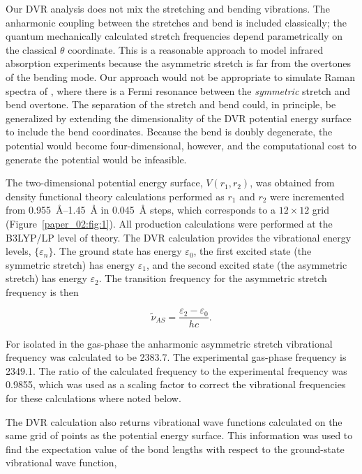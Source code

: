 Our DVR analysis does not mix the stretching and bending vibrations. The anharmonic coupling between the stretches and bend is included classically; the quantum mechanically calculated stretch frequencies depend parametrically on the classical \(\theta\) coordinate. This is a reasonable approach to model infrared absorption experiments because the asymmetric stretch is far from the overtones of the bending mode. Our approach would not be appropriate to simulate Raman spectra of , where there is a Fermi resonance between the \emph{symmetric} stretch and bend overtone. The separation of the stretch and bend could, in principle, be generalized by extending the dimensionality of the DVR potential energy surface to include the bend coordinates. Because the bend is doubly degenerate, the potential would become four-dimensional, however, and the computational cost to generate the potential would be infeasible.

The two-dimensional potential energy surface, \(V\left(r_1,r_2\right)\), was obtained from density functional theory calculations performed as \(r_1\) and \(r_2\) were incremented from \SIrange{0.955}{1.45}{\angstrom} in \SI{0.045}{\angstrom} steps, which corresponds to a \(12 \times 12\) grid (Figure~\ref{paper_02:fig:1}). All production calculations were performed at the B3LYP/LP level of theory. The DVR calculation provides the vibrational energy levels, \(\{\varepsilon_{n}\}\). The ground state has energy \(\varepsilon_{0}\), the first excited state (the symmetric stretch) has energy \(\varepsilon_{1}\), and the second excited state (the asymmetric stretch) has energy \(\varepsilon_{2}\). The transition frequency for the asymmetric stretch frequency is then

\begin{equation}
  \label{paper_02:eq:2}
  \widetilde{\nu}_{AS} = \frac{\varepsilon_{2} - \varepsilon_{0}}{hc}.
\end{equation}

For  isolated in the gas-phase the anharmonic asymmetric stretch vibrational frequency was calculated to be \SI{2383.7}{\wavenumber}. The experimental gas-phase frequency is \SI{2349.1}{\wavenumber}. The ratio of the calculated frequency to the experimental frequency was \num{0.9855}, which was used as a scaling factor to correct the vibrational frequencies for these calculations where noted below.

The DVR calculation also returns vibrational wave functions calculated on the same grid of points as the potential energy surface. This information was used to find the expectation value of the bond lengths with respect to the ground-state vibrational wave function,

